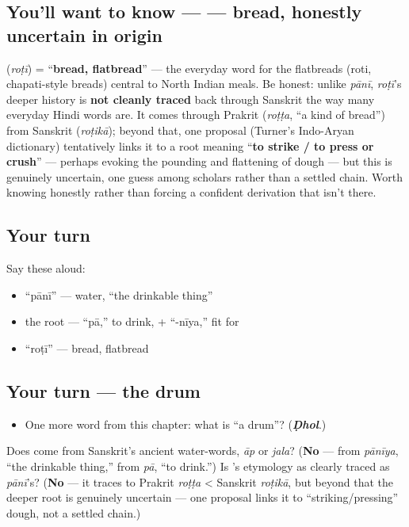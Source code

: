 \subsection*{You'll want to know —  — bread, honestly uncertain in origin}
\textbf{} (\emph{roṭī}) = \textquotedblleft{}\textbf{bread, flatbread}\textquotedblright{} — the everyday word for the flatbreads (roti, chapati-style breads) central to North Indian meals. Be honest: unlike \emph{pānī}, \emph{roṭī}'s deeper history is \textbf{not cleanly traced} back through Sanskrit the way many everyday Hindi words are. It comes through Prakrit \textbf{} (\emph{roṭṭa}, \textquotedblleft{}a kind of bread\textquotedblright{}) from Sanskrit \textbf{} (\emph{roṭikā}); beyond that, one proposal (Turner's Indo-Aryan dictionary) tentatively links it to a root meaning \textquotedblleft{}\textbf{to strike / to press or crush}\textquotedblright{} — perhaps evoking the pounding and flattening of dough — but this is genuinely uncertain, one guess among scholars rather than a settled chain. Worth knowing honestly rather than forcing a confident derivation that isn't there.

\subsection*{Your turn}
Say these aloud:

\begin{itemize}
\raggedright
  \item \textquotedblleft{}pānī\textquotedblright{} — water, \textquotedblleft{}the drinkable thing\textquotedblright{}
  \item the root — \textquotedblleft{}pā,\textquotedblright{} to drink, + \textquotedblleft{}-nīya,\textquotedblright{} fit for
  \item \textquotedblleft{}roṭī\textquotedblright{} — bread, flatbread
\end{itemize}

\subsection*{Your turn — the drum}
\begin{itemize}
\raggedright
  \item One more word from this chapter: what is \textquotedblleft{}a drum\textquotedblright{}? (\emph{\textbf{Ḍhol}}.)
\end{itemize}

\begin{tcolorbox}[breakable,colback=teal!4,colframe=teal!35!black,title={Before you move on}]
Does \textbf{} come from Sanskrit's ancient water-words, \emph{āp} or \emph{jala}? (\textbf{No} — from \textbf{} \emph{pānīya}, \textquotedblleft{}the drinkable thing,\textquotedblright{} from \textbf{} \emph{pā}, \textquotedblleft{}to drink.\textquotedblright{}) Is \textbf{}'s etymology as clearly traced as \emph{pānī}'s? (\textbf{No} — it traces to Prakrit \emph{roṭṭa} < Sanskrit \emph{roṭikā}, but beyond that the deeper root is genuinely uncertain — one proposal links it to \textquotedblleft{}striking/pressing\textquotedblright{} dough, not a settled chain.)
\end{tcolorbox}
